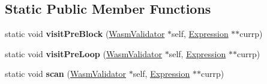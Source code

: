 \subsection*{Static Public Member Functions}
\begin{DoxyCompactItemize}
\item 
\mbox{\label{structwasm_1_1_wasm_validator_a6df8a0d52c6fed3cb8f370b87fd96626}} 
static void {\bfseries visit\+Pre\+Block} (\mbox{\hyperlink{structwasm_1_1_wasm_validator}{Wasm\+Validator}} $\ast$self, \mbox{\hyperlink{classwasm_1_1_expression}{Expression}} $\ast$$\ast$currp)
\item 
\mbox{\label{structwasm_1_1_wasm_validator_af596d68c1d191fa9e879eec89c5d05ca}} 
static void {\bfseries visit\+Pre\+Loop} (\mbox{\hyperlink{structwasm_1_1_wasm_validator}{Wasm\+Validator}} $\ast$self, \mbox{\hyperlink{classwasm_1_1_expression}{Expression}} $\ast$$\ast$currp)
\item 
\mbox{\label{structwasm_1_1_wasm_validator_a5a9afcb23ac3de8328929f7f270a050e}} 
static void {\bfseries scan} (\mbox{\hyperlink{structwasm_1_1_wasm_validator}{Wasm\+Validator}} $\ast$self, \mbox{\hyperlink{classwasm_1_1_expression}{Expression}} $\ast$$\ast$currp)
\end{DoxyCompactItemize}
